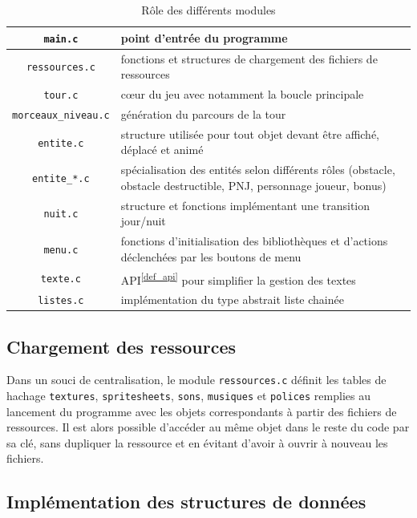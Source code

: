 \documentclass[a4paper,12pt]{article}
\newcommand\refsuscrite[1]{\textsuperscript{\ref{#1}}}
\begin{document}
\begin{table}[H]
    \centering
    \begin{tabular}{c p{}}
	\toprule
	\texttt{main.c}			    & point d’entrée du programme	\\
	\midrule
	\texttt{ressources.c}		    & fonctions et structures de chargement des fichiers de ressources	\\
	\midrule
	\texttt{tour.c}			    & cœur du jeu avec notamment la boucle principale	\\
	\midrule
        \texttt{morceaux\_niveau.c}	    & génération du parcours de la tour \\
	\midrule
	\texttt{entite.c}                   & structure utilisée pour tout objet devant être affiché, déplacé et animé  \\
	\midrule
        \texttt{entite\_*.c}                & spécialisation des entités selon différents rôles (obstacle, obstacle destructible, PNJ, personnage joueur, bonus)  \\
	\midrule
	\texttt{nuit.c}			    & structure et fonctions implémentant une transition jour/nuit \\
	\midrule
	\texttt{menu.c} 		    & fonctions d’initialisation des bibliothèques et d’actions déclenchées par les boutons de menu \\
	\midrule
	\texttt{texte.c}		    & API\refsuscrite{def_api} pour simplifier la gestion des textes   \\
	\midrule
	\texttt{listes.c}		    & implémentation du type abstrait liste chainée \\
	\bottomrule
    \end{tabular}
    \caption{Rôle des différents modules}
    \label{table_archi}
\end{table}

\subsection{Chargement des ressources}

Dans un souci de centralisation, le module \texttt{ressources.c} définit les tables de hachage \texttt{textures}, \texttt{spritesheets}, \texttt{sons}, \texttt{musiques} et \texttt{polices} remplies au lancement du programme avec les objets correspondants à partir des fichiers de ressources.
Il est alors possible d’accéder au même objet dans le reste du code par sa clé, sans dupliquer la ressource et en évitant d’avoir à ouvrir à nouveau les fichiers.

\subsection{Implémentation des structures de données}
\end{document}
